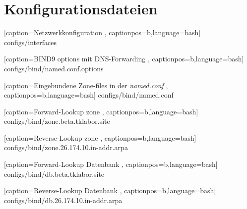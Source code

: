 \section{Konfigurationsdateien}

    [caption={Netzwerkkonfiguration}
       \label{lst:interfaces},
       captionpos=b,language=bash]
{configs/interfaces}


    [caption={BIND9 options mit DNS-Forwarding}
       \label{lst:named.conf.options},
       captionpos=b,language=bash]
{configs/bind/named.conf.options}


    [caption={Eingebundene Zone-files in der \textit{named.conf}}
       \label{lst:named.conf},
       captionpos=b,language=bash]
{configs/bind/named.conf}


    [caption={Forward-Lookup zone}
       \label{lst:forward-zone},
       captionpos=b,language=bash]
{configs/bind/zone.beta.tklabor.site}


    [caption={Reverse-Lookup zone}
       \label{lst:reverse-zone},
       captionpos=b,language=bash]
{configs/bind/zone.26.174.10.in-addr.arpa}


    [caption={Forward-Lookup Datenbank}
       \label{lst:forware-zone-db},
       captionpos=b,language=bash]
{configs/bind/db.beta.tklabor.site}


    [caption={Reverse-Lookup Datenbank}
       \label{lst:reverse-zone-db},
       captionpos=b,language=bash]
{configs/bind/db.26.174.10.in-addr.arpa}
